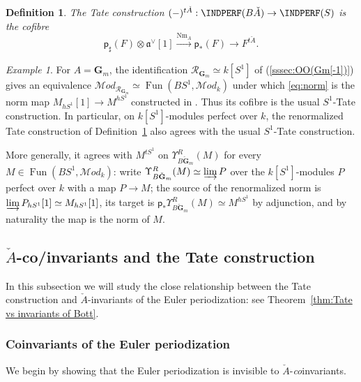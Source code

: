 \documentclass[12pt, oneside]{amsart}
\numberwithin{equation}{section}
\newtheorem{definition}[subsubsection]{Definition}
\theoremstyle{remark}
\newtheorem{example}[subsubsection]{Example}
\theoremstyle{plain}
\newcommand{\MOD}{\mathcal{M}\textit{od}}
\newcommand{\R}{\mathcal{R}}
\newcommand{\frav}{\mathfrak{a}^\vee}
\newcommand{\GG}{\mathbf{G}}
\newcommand{\GGm}{\mathbf{G}_{m}}
\newcommand{\Ren}{\Upsilon}
\newcommand{\Nm}{\operatorname{Nm}}
\newcommand{\sfp}{\mathsf{p}}
\begin{document}
\begin{definition}\label{defn:Tate}
	The \emph{Tate construction} $(-)^{t\check{A}} : \INDPERF(B\check{A}) \to \INDPERF(S)$ is the cofibre
	\[
	  \sfp_\sharp(F) \otimes \frav[1]
		\xrightarrow{\Nm_A} \sfp_*(F)
		\longrightarrow F^{t\check{A}}.
	\]
\end{definition}

\begin{example}\label{ex:Tate multiplicative}
For $A=\GGm$, the identification $\R_{\GGm}\simeq k[S^1]$ of (\ref{sssec:OO(Gm[-1])}) gives an equivalence $\MOD_{\R_{\GGm}}\simeq\operatorname{Fun}(BS^1,\MOD_k)$ under which \eqref{eq:norm} is the norm map $M_{hS^1}[1]\to M^{hS^1}$ constructed in \cite{GreenleesMay,NS}.
Thus its cofibre is the usual $S^1$-Tate construction.
In particular, on $k[S^1]$-modules perfect over $k$, the renormalized Tate construction of Definition~\ref{defn:Tate} also agrees with the usual $S^1$-Tate construction.

More generally, it agrees with $M^{tS^1}$ on $\Ren^R_{B\check{\GG}_m}(M)$ for every $M \in \operatorname{Fun}(BS^1, \MOD_k)$: write $\Ren^R_{B\check{\GG}_m}(M) \simeq \varinjlim P$ over the $k[S^1]$-modules $P$ perfect over $k$ with a map $P \to M$; the source of the renormalized norm is $\varinjlim P_{hS^1}[1] \simeq M_{hS^1}[1]$, its target is $\sfp_*\Ren^R_{B\check{\GG}_m}(M) \simeq M^{hS^1}$ by adjunction, and by naturality the map is the norm of $M$.
\end{example}

\subsection{\texorpdfstring{$\check{A}$}{Ǎ}-co/invariants and the Tate construction}\label{ssec:invariants vs Tate}

In this subsection we will study the close relationship between the Tate construction and $\check{A}$-invariants of the Euler periodization: see Theorem~\ref{thm:Tate vs invariants of Bott}.

\subsubsection{Coinvariants of the Euler periodization}\label{sssec:coinv Bott per}

We begin by showing that the Euler periodization is invisible to $\check{A}$-\emph{co}invariants.
\end{document}
